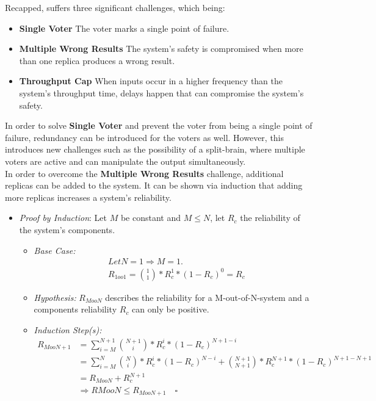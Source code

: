 Recapped,  suffers three significant challenges, which being:

\newcommand{\ChallengeWR}{\textbf{Multiple Wrong Results}\xspace}
\newcommand{\ChallengeVoter}{\textbf{Single Voter}\xspace}
\newcommand{\ChallengeThrough}{\textbf{Throughput Cap}\xspace}
\begin{itemize}
\item \ChallengeVoter The voter marks a single point of failure.
\item \ChallengeWR The system's safety is compromised when more than one replica produces a wrong result.
\item \ChallengeThrough When inputs occur in a higher frequency than the system's throughput time, delays happen that can compromise the system's safety.
\end{itemize}

In order to solve \ChallengeVoter and prevent the voter from being a single point of failure, redundancy can be introduced for the voters as well.
However, this introduces new challenges such as the possibility of a split-brain, where multiple voters are active and can manipulate the output simultaneously.
\\

In order to overcome the \ChallengeWR challenge, additional replicas can be added to the system.
It can be shown via induction that adding more replicas increases a system's reliability.

\begin{itemize}
\item \emph{Proof by Induction}: Let $M$ be constant and $M \leq N$, let $R_{c}$ the reliability of the system's components.
\begin{itemize}[label=$\lozenge$, itemsep=2ex]
\item \emph{Base Case:}
\begin{align*}
&Let N = 1 \Rightarrow M = 1.\\
&R_{1oo1} = {1 \choose 1} * R_{c}^1 * (1 - R_{c})^0 = R_{c}
\end{align*}

\item \emph{Hypothesis:} $R_{MooN}$ describes the reliability for a M-out-of-N-system and a components reliability $R_{c}$ can only be positive.

\item \emph{Induction Step(s):}
\begin{align*}
R_{MooN+1} &= \sum_{i=M}^{N+1} {N + 1 \choose i} * R_{c}^i * (1 - R_c)^{N + 1 - i}\\
&= \sum_{i=M}^{N} {N \choose i} * R_{c}^i * (1 - R_c)^{N - i} + {N+1 \choose N+1} * R_c^{N+1} * (1 - R_c)^{N+1 - N+1}\\
&= R_{MooN} + R_c^{N+1} \\
&\Rightarrow R{MooN} \leq R_{MooN+1} \quad \square
\end{align*}
\end{itemize}
\end{itemize}



